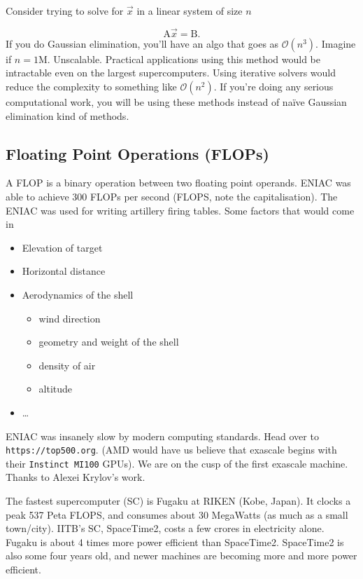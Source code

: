 \documentclass[a4paper]{article}
\begin{document}
Consider trying to solve for $\vec{x}$ in a linear system of size $n$

\begin{equation}
	\mathrm A \vec{x} = \mathrm B.
\end{equation}
If you do Gaussian elimination, you'll have an algo that goes as
$\mathcal{O}(n^3)$. Imagine if $n = 1\text{M}$. Unscalable.  Practical
applications using this method would be intractable even on the largest supercomputers.
Using iterative solvers would reduce the complexity to something 
like  $\mathcal{O}(n^2)$. If you're doing any serious computational
work, you will be using these methods instead of na\"ive Gaussian
elimination kind of methods.

\subsection*{Floating Point Operations (FLOPs)}
A FLOP is a binary operation between two floating point operands.
ENIAC was able to achieve 300 FLOPs per second (FLOPS, note the capitalisation). The ENIAC was used for writing artillery firing tables.
Some factors that would come in
\begin{itemize}
	\item Elevation of target
	\item Horizontal distance
	\item Aerodynamics of the shell
		\begin{itemize}
			\item wind direction
			\item geometry and weight of the shell
			\item density of air
			\item altitude
		\end{itemize}
	\item \ldots
\end{itemize}

ENIAC was insanely slow by modern computing standards. Head over to
\texttt{https://top500.org}. (AMD would have us believe that exascale
begins with their \texttt{Instinct MI100} GPUs). We are on the cusp of
the first exascale
machine. Thanks to Alexei Krylov's work.

The fastest supercomputer (SC) is Fugaku at RIKEN (Kobe, Japan). It
clocks a peak 537 Peta FLOPS, and consumes about 30 MegaWatts (as much
as a small town/city). IITB's SC, SpaceTime2, costs a few crores in
electricity alone. Fugaku is about 4 times more power efficient than
SpaceTime2. SpaceTime2 is also some four years old, and newer machines
are becoming more and more power efficient.
\end{document}
